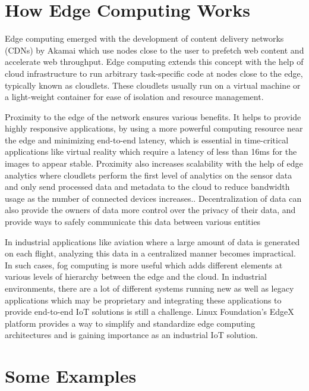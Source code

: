 \documentclass[sigconf]{acmart}
\begin{document}
\section{How Edge Computing Works}
Edge computing emerged with the development of content delivery networks (CDNs) by Akamai which use nodes close to the user to prefetch web content and accelerate web throughput. Edge computing extends this concept with the help of cloud infrastructure to run arbitrary task-specific code at nodes close to the edge, typically known as cloudlets. These cloudlets usually run on a virtual machine or a light-weight container for ease of isolation and resource management.\cite{satyanarayananemergence}

Proximity to the edge of the network ensures various benefits. It helps to provide highly responsive applications, by using a more powerful computing resource near the edge and minimizing end-to-end latency, which is essential in time-critical applications like virtual reality which require a latency of less than 16ms for the images to appear stable.\cite{rocket-real-time-video}\cite{satyanarayananemergence} Proximity also increases scalability with the help of edge analytics where cloudlets perform the first level of analytics on the sensor data and only send processed data and metadata to the cloud to reduce bandwidth usage as the number of connected devices increases.\cite{satyanarayananemergence}.  Decentralization of data can also provide the owners of data more control over the privacy of their data, and provide ways to safely communicate this data between various entities\cite{ibm_iot_edge}\cite{FADES-offloading}

In industrial applications like aviation where a large amount of data is generated on each flight\cite{satyanarayananemergence}, analyzing this data in a centralized manner becomes impractical. In such cases, fog computing is more useful which adds different elements at various levels of hierarchy between the edge and the cloud\cite{rt_insights_iiot}. In industrial environments, there are a lot of different systems running new as well as legacy applications which may be proprietary and integrating these applications to provide end-to-end IoT solutions is still a challenge. Linux Foundation's EdgeX platform provides a way to simplify and standardize edge computing architectures and is gaining importance as an industrial IoT solution.\cite{rt_insights_iiot}

\section{Some Examples}
\end{document}

